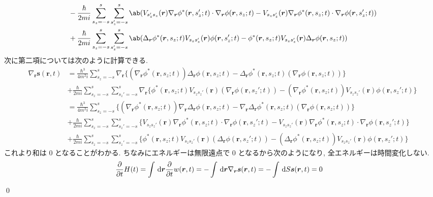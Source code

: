 \documentclass[uplatex,dvipdfmx,a4paper,11pt]{jlreq}
\makeatletter
\newcommand{\rr}{\bm{r}}
\renewcommand{\ss}{\bm{s}}
\numberwithin{equation}{section}
\theoremstyle{definition}
\renewenvironment{proof}[1][\proofname]{\par
  \normalfont
  \topsep6\p@\@plus6\p@ \trivlist
  \item[\hskip\labelsep{\bfseries #1}\@addpunct{\bfseries}]\ignorespaces\quad\par
}{
  \qed\endtrivlist\@endpefalse
}
\renewcommand\proofname{証明}
\makeatother
\begin{document}
\begin{proof}
\begin{align}
                         & - \frac{\hbar}{2mi}\sum_{s_z = -s}^{s}\sum_{s_z' = -s}^{s}\ab(V_{s_z's_z}(\rr)\nabla_{\rr}\phi^*(\rr, s_z'; t)\cdot\nabla_{\rr}\phi(\rr, s_z; t) - V_{s_zs_z'}(\rr)\nabla_{\rr}\phi^*(\rr, s_z; t)\cdot\nabla_{\rr}\phi(\rr, s_z'; t)) \\
                         & + \frac{\hbar}{2mi}\sum_{s_z = -s}^{s}\sum_{s_z' = -s}^{s}\ab(\Delta_{\rr}\phi^*(\rr, s_z; t)V_{s_zs_z'}(\rr)\phi(\rr, s_z'; t) - \phi^*(\rr, s_z; t)V_{s_zs_z'}(\rr)\Delta_{\rr}\phi(\rr, s_z; t))
  \end{align}
  次に第二項については次のように計算できる.
  \begin{align}
    \nabla_{\rr}\ss(\rr, t) & = \frac{\hbar^3}{4m^2i}\sum_{s_z = -s}^{s}\nabla_{\rr}\{(\nabla_{\rr}\phi^*(\rr, s_z; t))\Delta_{\rr}\phi(\rr, s_z; t) - \Delta_{\rr}\phi^*(\rr, s_z; t)(\nabla_{\rr}\phi(\rr, s_z; t))\}                                             \\
                            & + \frac{\hbar}{2mi}\sum_{s_z = -s}^{s}\sum_{s_z' = -s}^{s}\nabla_{\rr}\{\phi^*(\rr, s_z; t)V_{s_zs_z'}(\rr)(\nabla_{\rr}\phi(\rr, s_z'; t)) - (\nabla_{\rr}\phi^*(\rr, s_z; t))V_{s_zs_z'}(\rr)\phi(\rr, s_z'; t)\}                   \\
                            & = \frac{\hbar^3}{4m^2i}\sum_{s_z = -s}^{s}\{(\nabla_{\rr}\phi^*(\rr, s_z; t))\nabla_{\rr}\Delta_{\rr}\phi(\rr, s_z; t) - \nabla_{\rr}\Delta_{\rr}\phi^*(\rr, s_z; t)(\nabla_{\rr}\phi(\rr, s_z; t))\}                                 \\
                            & + \frac{\hbar}{2mi}\sum_{s_z = -s}^{s}\sum_{s_z' = -s}^{s}\{V_{s_zs_z'}(\rr)\nabla_{\rr}\phi^*(\rr, s_z; t)\cdot\nabla_{\rr}\phi(\rr, s_z'; t) - V_{s_zs_z'}(\rr)\nabla_{\rr}\phi^*(\rr, s_z; t)\cdot\nabla_{\rr}\phi(\rr, s_z'; t)\} \\
                            & + \frac{\hbar}{2mi}\sum_{s_z = -s}^{s}\sum_{s_z' = -s}^{s}\{\phi^*(\rr, s_z; t)V_{s_zs_z'}(\rr)(\Delta_{\rr}\phi(\rr, s_z'; t)) - (\Delta_{\rr}\phi^*(\rr, s_z; t))V_{s_zs_z'}(\rr)\phi(\rr, s_z'; t)\}
  \end{align}
  これより和は 0 となることがわかる. ちなみにエネルギーは無限遠点で 0 となるから次のようになり, 全エネルギーは時間変化しない.
  \begin{align}
    \diffp{}{t}H(t) & = \int\dl{\rr}\diffp{}{t}w(\rr, t) = -\int\dl{\rr}\nabla_{\rr}\ss(\rr, t) = -\int\dl{S}\ss(\rr, t) = 0
  \end{align}
\end{proof}
\end{document}
